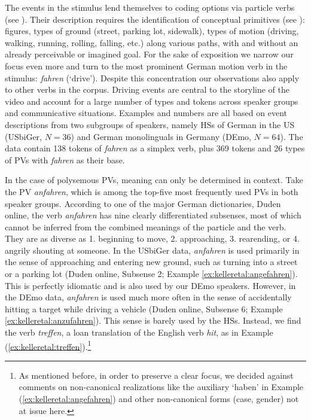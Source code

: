 \documentclass[output=paper,colorlinks,citecolor=brown]{langscibook}
\begin{document}
The events in the stimulus lend themselves to coding options via particle verbs (see ). Their description requires the identification of conceptual primitives (see \citealt{Talmy1972Basis, Slobin2003Language}): figures, types of ground (street, parking lot, sidewalk), types of motion (driving, walking, running, rolling, falling, etc.) along various paths, with and without an already perceivable or imagined goal. For the sake of exposition we narrow our focus even more and turn to the most prominent German motion verb in the stimulus: \textit{fahren} (`drive'). Despite this concentration our observations also apply to other verbs in the corpus. Driving events are central to the storyline of the video and account for a large number of types and tokens across speaker groups and communicative situations. Examples and numbers are all based on event descriptions from two subgroups of speakers, namely HSs of German in the US (USbiGer, $N=36$) and German monolinguals in Germany (DEmo, $N=64$). The data contain 138 tokens of \textit{fahren} as a simplex verb, plus 369 tokens and 26 types of PVs with \textit{fahren} as their base.\largerpage

In the case of polysemous PVs, meaning can only be determined in context. Take the PV \textit{anfahren}, which is among the top-five most frequently used PVs in both speaker groups. According to one of the major German dictionaries, Duden online, the verb \textit{anfahren} has nine clearly differentiated subsenses, most of which cannot be inferred from the combined meanings of the particle and the verb. They are as diverse as 1. beginning to move, 2. approaching, 3. rearending, or 4. angrily shouting at someone. In the USbiGer data, \textit{anfahren} is used primarily in the sense of approaching and entering new ground, such as turning into a street or a parking lot (Duden online, Subsense 2; Example \ref{ex:kelleretal:angefahren}). This is perfectly idiomatic and is also used by our DEmo speakers. However, in the DEmo data, \textit{anfahren} is used much more often in the sense of accidentally hitting a target while driving a vehicle (Duden online, Subsense 6; Example \ref{ex:kelleretal:anzufahren}). This sense is barely used by the HSs. Instead, we find the verb \textit{treffen}, a loan translation of the English verb \textit{hit}, as in Example (\ref{ex:kelleretal:treffen}).{\footnote{As mentioned before, in order to preserve a clear focus, we decided against comments on non-canonical realizations like the auxiliary `haben' in Example (\ref{ex:kelleretal:angefahren}) and other non-canonical forms (case, gender) not at issue here.}}
\end{document}
